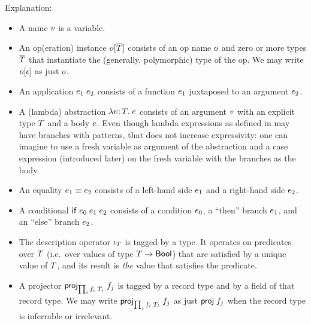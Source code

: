 Explanation:
\begin{itemize}
\item
A name $v$ is a variable.
\item
An op(eration) instance $o[\overline{T}]$ consists of an op name $o$ and zero or more
types $\overline{T}$ that instantiate the (generally, polymorphic) type of the op. We
may write $o[\epsilon]$ as just $o$.
\item
An application $e_1\;e_2$ consists of a function $e_1$ juxtaposed to an
argument $e_2$.
\item
A (lambda) abstraction $\lambda v\!:\!T.\;e$ consists of an argument $v$ with an explicit
type $T$ and a body $e$. Even though lambda expressions as defined in
\cite{lm} may have branches with patterns, that does not increase
expressivity: one can imagine to use a fresh variable as argument of the
abstraction and a case expression (introduced later) on the fresh variable
with the branches as the body.
\item
An equality $e_1\equiv e_2$ consists of a left-hand side $e_1$ and a right-hand
side $e_2$.
\item
A conditional $\mathsf{if}\;e_0\;e_1\;e_2$ consists of a condition $e_0$, a ``then'' branch
$e_1$, and an ``else'' branch $e_2$.
\item
The description operator $\iota_{T}$ is tagged by a type. It operates on
predicates over $T$ (i.e.\ over values of type $T\to\mathsf{Bool}$) that
are satisfied by a unique value of $T$, and its result is \emph{the} value
that satisfies the predicate.
\item
A projector $\mathsf{proj}_{\prod_{i}f_i\;T_i}\;{f_j}$ is tagged by a record type and by a field of that
record type. We may write $\mathsf{proj}_{\prod_{i}f_i\;T_i}\;{f_j}$ as just $\mathsf{proj}\;{f_j}$ when the record type is
inferrable or irrelevant.
\end{itemize}

